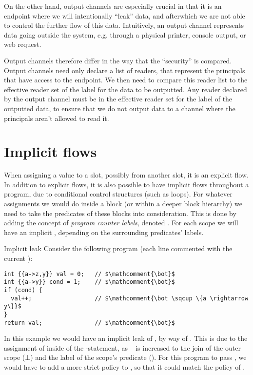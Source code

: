 On the other hand, output channels are especially crucial in that it is an endpoint where we will intentionally ``leak'' data, and afterwhich we are not able to control the further flow of this data.
Intuitively, an output channel represents data going outside the system, e.g. through a physical printer, console output, or web request.

Output channels therefore differ in the way that the ``security'' is compared.
Output channels need only declare a list of readers, that represent the principals that have access to the endpoint.
We then need to compare this reader list to the effective reader set of the label for the data to be outputted.
Any reader declared by the output channel must be in the effective reader set for the label of the outputted data, to ensure that we do not output data to a channel where the principals aren't allowed to read it.

\section{Implicit flows}\label{dlm:implicit_flows}
When assigning a value to a slot, possibly from another slot, it is an explicit flow.
In addition to explicit flows, it is also possible to have implicit flows throughout a program, due to conditional control structures (such as loops).
For whatever assignments we would do inside a block (or within a deeper block hierarchy) we need to take the predicates of these blocks into consideration.
This is done by adding the concept of \emph{program counter labels}, denoted \dlmpc.
For each scope we will have an implicit \dlmpc, depending on the surrounding predicates' labels.

\begin{example}{Implicit leak}\label{dlm:ex:implicit_leak}
  Consider the following program (each line commented with the current \dlmpc):
  \begin{lstlisting}[style=dlmc]
int {{a->z,y}} val = 0;   // $\mathcomment{\bot}$
int {{a->y}} cond = 1;    // $\mathcomment{\bot}$
if (cond) {
  val++;                  // $\mathcomment{\bot \sqcup \{a \rightarrow y\}}$
}
return val;               // $\mathcomment{\bot}$
  \end{lstlisting}
  In this example we would have an implicit leak of , by way of .
  This is due to the assignment of  inside of the -statement, as \dlmpc~ is increased to the join of the outer scope ($\bot$) and the label of the scope's predicate ().
  For this program to pass \thetool, we would have to add a more strict policy to , so that it could match the policy of .
\end{example}

